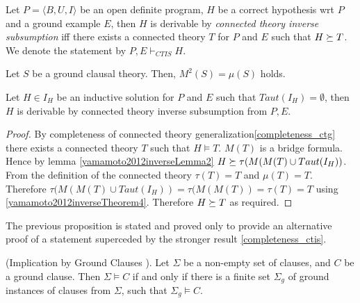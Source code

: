 \begin{defn}
Let $P=\langle B, U, I \rangle$ be an open definite program, $H$ be a correct hypothesis wrt $P$ and a ground example $E$, then $H$ is derivable by
\emph{connected theory inverse subsumption}
iff there exists a connected theory $T$ for $P$ and $E$ such that $H \succeq T$.
We denote the statement by $P, E \vdash_{CTIS} H$.
\end{defn}

\begin{thm}\label{yamamoto2012inverseTheorem4}\cite{yamamoto2012inverse}
Let $S$ be a ground clausal theory. Then, $M^2(S) = \mu(S)$ holds.
\end{thm}

\begin{proposition}
Let $H \in I_H$ be an inductive solution for $P$ and $E$ such that $Taut(I_H)=\emptyset$, then $H$ is derivable by connected theory inverse subsumption from $P, E$.
\end{proposition}
\begin{proof}
By completeness of connected theory generalization\ref{completeness_ctg} there exists a connected theory $T$ such that $H \models T$. $M(T)$ is a bridge formula.
Hence by lemma \ref{yamamoto2012inverseLemma2}
$H \succeq \tau(M(M(T) \cup Taut(I_H))$. From the definition of the connected theory $\tau(T)=T$ and $\mu (T)=T$.
Therefore $\tau(M(M(T) \cup Taut(I_H))=\tau(M(M(T))=\tau(T)=T$ using
\ref{yamamoto2012inverseTheorem4}. Therefore $H \succeq T$ as required.
\end{proof}
\begin{remark}
The previous proposition is stated and proved only to provide an alternative proof of a statement superceded by the stronger result \ref{completeness_ctis}.
\end{remark}

\begin{thm}\label{implicationByGroundClauses}
(Implication by Ground Clauses \cite{nienhuys1997foundations}). Let $\Sigma$ be a non-empty set of clauses,
and $C$ be a ground clause. Then $\Sigma \models C$ if and only if there is a finite set $\Sigma_g$ of ground
instances of clauses from $\Sigma$, such that $\Sigma_g \models C$.
\end{thm}

